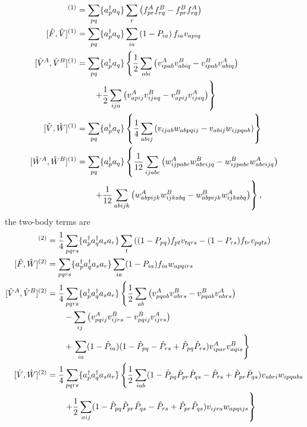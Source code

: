 \begin{align}
[\hat{F}^A,\hat{F}^B]^{(1)} &= \sum_{pq} \lbrace \ad_p a_q \rbrace  \sum_r \lb f^A_{pr}f^B_{rq} - f^B_{pr} f^A_{rq}\rb \\
[\hat{F},\hat{V}]^{(1)} &= \sum_{pq} \lbrace \ad_p a_q \rbrace  \sum_{ia} \lb 1-P_{ia}\rb f_{ia} v_{apiq} \\
[\hat{V}^A,\hat{V}^B]^{(1)} &= \sum_{pq} \lbrace \ad_p a_q \rbrace \left\lbrace \frac{1}{2} \sum_{abi} \lb v^A_{ipab}v^B_{abiq} - v^B_{ipab} v^A_{abiq} \rb \right. \notag \\
&\qquad \left. + \frac{1}{2} \sum_{ija} \lb v^A_{apij}v^B_{ijaq} - v^B_{apij} v^A_{ijaq} \rb \right\rbrace\\
[\hat{V},\hat{W}]^{(1)} &= \sum_{pq} \lbrace \ad_p a_q\rbrace \left\lbrace\frac{1}{4}  \sum_{abij} \lb v_{ijab}w_{abpqij} - v_{abij}w_{ijpqab} \rb \right\rbrace\\
[\hat{W}^A,\hat{W}^B]^{(1)} &= \sum_{pq} \lbrace \ad_p a_q \rbrace \left\lbrace \frac{1}{12} \sum_{ijabc} \lb w^A_{ijpabc} w^B_{abcijq} - w^B_{ijpabc} w^A_{abcijq} \rb \notag \right.\\
&\left.\qquad + \frac{1}{12} \sum_{abijk} \lb w^A_{abpijk} w^B_{ijkabq} - w^B_{abpijk} w^A_{ijkabq} \rb\right\rbrace, 
\end{align}
the two-body terms are
\begin{align}
[\hat{F},\hat{V}]^{(2)} &= \frac{1}{4}\sum_{pqrs}\lbrace \ad_p\ad_q a_s a_r \rbrace \sum_t \lb (1-P_{pq}) f_{pt} v_{tqrs} - (1-P_{rs})f_{tr} v_{pqts}\rb \\
[ \hat{F},\hat{W}]^{(2)} &= \sum_{pqrs}\lbrace \ad_p \ad_q a_s a_r \rbrace \sum_{ia} (1-P_{ia}) f_{ia} w_{apqirs} \\
[\hat{V}^A, \hat{V}^B ]^{(2)} &= \frac{1}{4}\sum_{pqrs}\lbrace \ad_p\ad_q a_s a_r \rbrace  \left\lbrace
\frac{1}{2} \sum_{ab} \lb v^A_{pqab} v^B_{abrs} - v^B_{pqab} v^A_{abrs} \rb \right.\notag\\
& \qquad-  \sum_{ij} \lb v^A_{pqij} v^B_{ijrs} - v^B_{pqij} v^A_{ijrs} \rb 
 \notag \\
&\qquad + \left. \sum_{ia} (1-\hat{P}_{ia})(1-\hat{P}_{pq}-\hat{P}_{rs}+\hat{P}_{pq}\hat{P}_{rs}) v^A_{ipar} v^B_{aqis}  \right\rbrace\\
[ \hat{V},\hat{W}]^{(2)} &= \frac{1}{4}\sum_{pqrs}\lbrace \ad_p\ad_q a_s a_r \rbrace  \left\lbrace\frac{1}{2} \sum_{iab}(1-\hat{P}_{pq}\hat{P}_{pr}\hat{P}_{qs} - \hat{P}_{rs} + \hat{P}_{pr}\hat{P}_{qs}) v_{abri}w_{ipqabs}\right. \notag \\
&\left.\qquad + \frac{1}{2} \sum_{aij}(1-\hat{P}_{pq}\hat{P}_{pr}\hat{P}_{qs} - \hat{P}_{rs} + \hat{P}_{pr}\hat{P}_{qs}) v_{ijra}w_{apqijs}\right\rbrace
\end{align}
